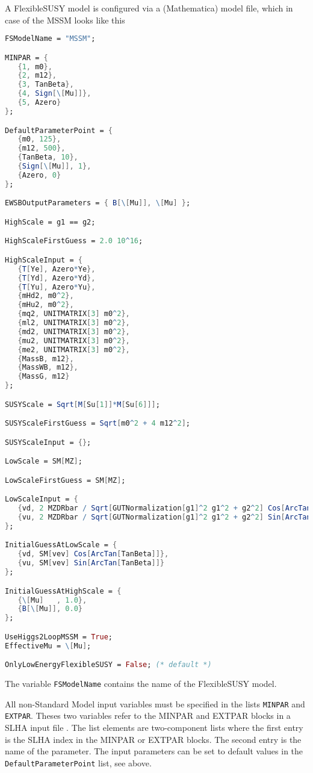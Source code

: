 \documentclass[final,3p,times,pdflatex]{elsarticle}
\newcommand{\fs}{FlexibleSUSY\xspace}
\newcommand{\code}[1]{\lstinline|#1|}  %
\begin{document}
A \fs model is configured via a (Mathematica) model file, which in
case of the MSSM looks like this
%
\begin{lstlisting}[language=Mathematica]
FSModelName = "MSSM";

MINPAR = {
   {1, m0},
   {2, m12},
   {3, TanBeta},
   {4, Sign[\[Mu]]},
   {5, Azero}
};

DefaultParameterPoint = {
   {m0, 125},
   {m12, 500},
   {TanBeta, 10},
   {Sign[\[Mu]], 1},
   {Azero, 0}
};

EWSBOutputParameters = { B[\[Mu]], \[Mu] };

HighScale = g1 == g2;

HighScaleFirstGuess = 2.0 10^16;

HighScaleInput = {
   {T[Ye], Azero*Ye},
   {T[Yd], Azero*Yd},
   {T[Yu], Azero*Yu},
   {mHd2, m0^2},
   {mHu2, m0^2},
   {mq2, UNITMATRIX[3] m0^2},
   {ml2, UNITMATRIX[3] m0^2},
   {md2, UNITMATRIX[3] m0^2},
   {mu2, UNITMATRIX[3] m0^2},
   {me2, UNITMATRIX[3] m0^2},
   {MassB, m12},
   {MassWB, m12},
   {MassG, m12}
};

SUSYScale = Sqrt[M[Su[1]]*M[Su[6]]];

SUSYScaleFirstGuess = Sqrt[m0^2 + 4 m12^2];

SUSYScaleInput = {};

LowScale = SM[MZ];

LowScaleFirstGuess = SM[MZ];

LowScaleInput = {
   {vd, 2 MZDRbar / Sqrt[GUTNormalization[g1]^2 g1^2 + g2^2] Cos[ArcTan[TanBeta]]},
   {vu, 2 MZDRbar / Sqrt[GUTNormalization[g1]^2 g1^2 + g2^2] Sin[ArcTan[TanBeta]]}
};

InitialGuessAtLowScale = {
   {vd, SM[vev] Cos[ArcTan[TanBeta]]},
   {vu, SM[vev] Sin[ArcTan[TanBeta]]}
};

InitialGuessAtHighScale = {
   {\[Mu]   , 1.0},
   {B[\[Mu]], 0.0}
};

UseHiggs2LoopMSSM = True;
EffectiveMu = \[Mu];

OnlyLowEnergyFlexibleSUSY = False; (* default *)
\end{lstlisting}
%
The variable \code{FSModelName} contains the name of the \fs model.

All non-Standard Model input variables must be specified in the lists
\code{MINPAR} and \code{EXTPAR}.  Theses two variables refer to the
MINPAR and EXTPAR blocks in a SLHA input file \cite{Skands:2003cj}.
The list elements are two-component lists where the first entry is the
SLHA index in the MINPAR or EXTPAR blocks.  The second entry is the
name of the parameter.  The input parameters can be set to default
values in the \code{DefaultParameterPoint} list, see above.
\end{document}
